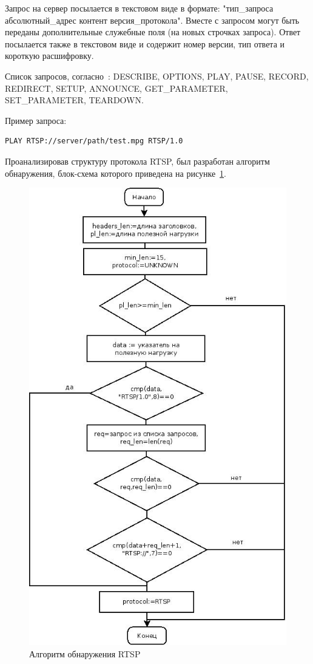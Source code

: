 Запрос на сервер посылается в текстовом виде в формате: "тип\_запроса абсолютный\_адрес контент версия\_протокола". Вместе с запросом могут быть переданы дополнительные служебные поля (на новых строчках запроса). Ответ посылается также в текстовом виде и содержит номер версии, тип ответа и короткую расшифровку.

Список запросов, согласно~\cite{rtsp_rfc}: DESCRIBE, OPTIONS, PLAY, PAUSE, RECORD, REDIRECT, SETUP, ANNOUNCE, GET\_PARAMETER, SET\_PARAMETER, TEARDOWN.

Пример запроса:
\begin{lstlisting}
PLAY RTSP://server/path/test.mpg RTSP/1.0
\end{lstlisting}

Проанализировав структуру протокола RTSP, был разработан алгоритм обнаружения, блок-схема которого приведена на рисунке~\ref{pic:rtsp_alg}.
\begin{figure}
\centering
\includegraphics[scale=0.6]{pictures/rtsp_alg}
\caption{Алгоритм обнаружения RTSP}
\label{pic:rtsp_alg}
\end{figure}

